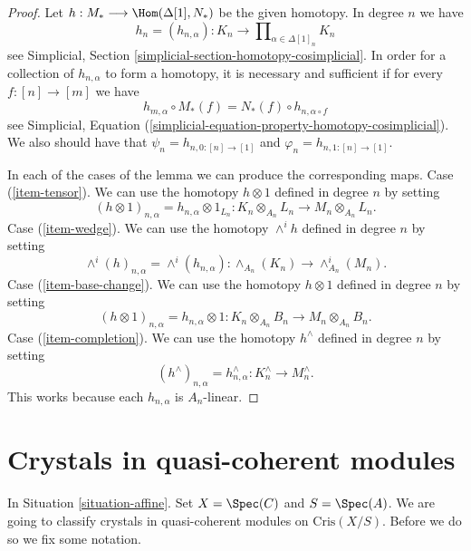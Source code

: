 \begin{proof}
Let $h : M_* \longrightarrow \Hom(\Delta[1], N_*)$ be the given
homotopy. In degree $n$ we have
$$
h_n = (h_{n, \alpha}) :
K_n \longrightarrow
\prod\nolimits_{\alpha \in \Delta[1]_n} K_n
$$
see Simplicial, Section \ref{simplicial-section-homotopy-cosimplicial}.
In order for a collection of $h_{n, \alpha}$ to form a homotopy,
it is necessary and sufficient if for every $f : [n] \to [m]$ we
have
$$
h_{m, \alpha} \circ M_*(f) = N_*(f) \circ h_{n, \alpha \circ f}
$$
see
Simplicial, Equation (\ref{simplicial-equation-property-homotopy-cosimplicial}).
We also should have that $\psi_n = h_{n, 0 : [n] \to [1]}$ and
$\varphi_n = h_{n, 1 : [n] \to [1]}$.

\medskip\noindent
In each of the cases of the lemma we can produce the corresponding maps.
Case (\ref{item-tensor}). We can use the homotopy $h \otimes 1$ defined
in degree $n$ by setting
$$
(h \otimes 1)_{n, \alpha} = h_{n, \alpha} \otimes 1_{L_n} :
K_n \otimes_{A_n} L_n
\longrightarrow
M_n \otimes_{A_n} L_n.
$$
Case (\ref{item-wedge}). We can use the homotopy $\wedge^ih$ defined
in degree $n$ by setting
$$
\wedge^i(h)_{n, \alpha} = \wedge^i(h_{n, \alpha}) :
\wedge_{A_n}(K_n)
\longrightarrow
\wedge^i_{A_n}(M_n).
$$
Case (\ref{item-base-change}). We can use the homotopy $h \otimes 1$ defined
in degree $n$ by setting
$$
(h \otimes 1)_{n, \alpha} = h_{n, \alpha} \otimes 1 :
K_n \otimes_{A_n} B_n
\longrightarrow
M_n \otimes_{A_n} B_n.
$$
Case (\ref{item-completion}). We can use the homotopy $h^\wedge$ defined
in degree $n$ by setting
$$
(h^\wedge)_{n, \alpha} = h_{n, \alpha}^\wedge :
K_n^\wedge
\longrightarrow
M_n^\wedge.
$$
This works because each $h_{n, \alpha}$ is $A_n$-linear.
\end{proof}






\section{Crystals in quasi-coherent modules}
\label{section-quasi-coherent-crystals}

\noindent
In Situation \ref{situation-affine}.
Set $X = \Spec(C)$ and $S = \Spec(A)$. We are going to
classify crystals in quasi-coherent modules on $\text{Cris}(X/S)$.
Before we do so we fix some notation.

